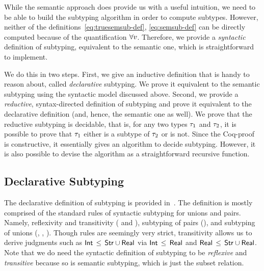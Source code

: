 While the semantic approach does provide us with a useful intuition,
we need to be able to build the subtyping algorithm 
in order to compute subtypes.
However, neither of the definitions~\eqref{eq:truesemsub-def}, \eqref{eq:semsub-def} 
can be directly computed because of the quantification $\forall v$.
Therefore, we provide a \emph{syntactic} definition of subtyping, 
equivalent to the semantic one, which is straightforward to implement.

We do this in two steps. 
First, we give an inductive definition that is handy to reason about,
called \emph{declarative} subtyping. 
We prove it equivalent to the semantic subtyping using the syntactic model
discussed above.
Second, we provide a \emph{reductive}, syntax-directed definition of subtyping
and prove it equivalent to the declarative definition 
(and, hence, the semantic one as well).
We prove that the reductive subtyping is decidable, 
that is, for any two types $\tau_1$ and $\tau_2$,
it is possible to prove that $\tau_1$ either is a subtype of $\tau_2$ or is not.
Since the Coq-proof is constructive, it essentially gives an algorithm
to decide subtyping. However, it is also possible to devise the algorithm
as a straightforward recursive function.

\subsection{Declarative Subtyping}

The declarative definition of subtyping is provided in~.
The definition is mostly comprised of the standard rules
of syntactic subtyping for unions and pairs.
Namely, reflexivity and transitivity ( and ), 
subtyping of pairs (),
and subtyping of unions (, , ).
Though  rules are seemingly very strict, 
transitivity allows us to derive judgments such as
$\mathsf{Int} \, \leq \, \mathsf{Str} \cup \mathsf{Real}$ via
$\mathsf{Int} \, \leq \, \mathsf{Real}$ and $\mathsf{Real} \, \leq \, \mathsf{Str} \cup \mathsf{Real}$.
Note that we do need the syntactic definition of subtyping
to be \emph{reflexive} and \emph{transitive}
because so is semantic subtyping, which is just the subset relation.


